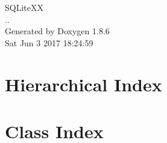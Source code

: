\documentclass[twoside]{book}
\newcommand{\clearemptydoublepage}{%
  \newpage{\pagestyle{empty}\cleardoublepage}%
}
\begin{document}
\hypersetup{pageanchor=false}
\begin{titlepage}
\vspace*{7cm}
\begin{center}%
{\Large S\-Q\-Lite\-X\-X \\[1ex]\large .. }\\
\vspace*{1cm}
{\large Generated by Doxygen 1.8.6}\\
\vspace*{0.5cm}
{\small Sat Jun 3 2017 18:24:59}\\
\end{center}
\end{titlepage}
\clearemptydoublepage
\tableofcontents
\clearemptydoublepage
{}
\hypersetup{pageanchor=true}

\chapter{Hierarchical Index}

\chapter{Class Index}

\end{document}
